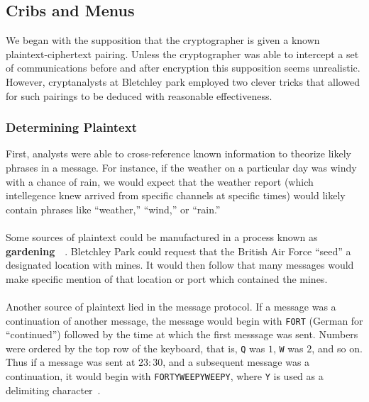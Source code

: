 \subsection{Cribs and Menus}

We began with the supposition that the
cryptographer is given a known plaintext-ciphertext pairing. Unless
the cryptographer was able to intercept
a set of communications before and after encryption this supposition
seems unrealistic. However, cryptanalysts at Bletchley park
employed two clever tricks that allowed for such pairings to be
deduced with reasonable effectiveness.
\subsubsection{Determining Plaintext}
First, analysts were able to cross-reference known information to
theorize likely phrases in a
message. For instance, if the weather on a particular day was windy
with a chance of rain, we would expect that the weather report (which
intellegence knew arrived from specific channels at specific times)
would likely contain phrases like ``weather,'' ``wind,'' or ``rain.''
\\\\Some sources of plaintext could be manufactured in a process
known as {\bf{gardening}}~\cite[p.~187]{sebag-montefiore2000enigma}~\cite[p.~144]{kahn1991seizing}. Bletchley Park could request that the
British Air Force ``seed'' a designated location with mines. It would
then follow that many messages would make specific mention of that
location or port which contained the mines.
\\\\Another source of plaintext lied in the message protocol. If a
message was a continuation of another message, the message would
begin with \texttt{FORT} (German for ``continued'') followed by the
time at which the first messsage was sent. Numbers were ordered by
the top row of the keyboard, that is, \texttt{Q} was $1$, \texttt{W}
was $2$, and so on.  Thus if a message was sent at $23:30$, and a
subsequent message was a continuation, it would begin with
\texttt{FORTYWEEPYWEEPY}, where \texttt{Y} is used as a delimiting character~\cite[pp.~278--279]{action_this_day}.

